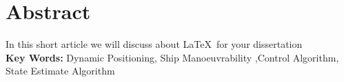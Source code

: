 \section*{ \centering \textbf{Abstract}}

In this short article we will discuss about \LaTeX\,  for your dissertation \\

\textbf{Key Words:} Dynamic Positioning, Ship Manoeuvrability ,Control Algorithm, State Estimate Algorithm
\clearpage





